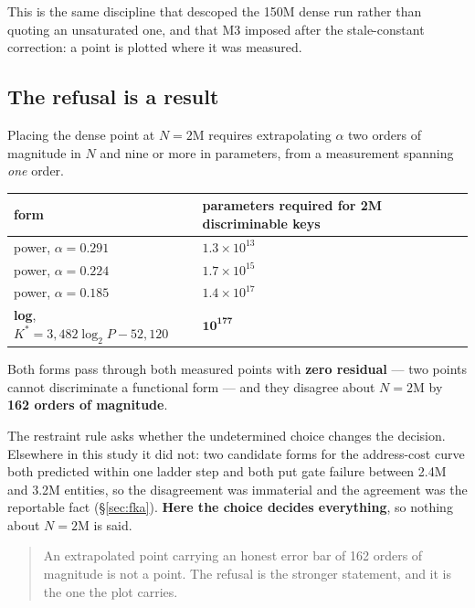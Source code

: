 This is the same discipline that descoped the 150M dense run rather than quoting an unsaturated one,
and that M3 imposed after the stale-constant correction: a point is plotted where it was measured.

\subsection{The refusal is a result}
\label{sec:refusal}

Placing the dense point at $N = 2$M requires extrapolating $\alpha$ two orders of magnitude in $N$
and nine or more in parameters, from a measurement spanning \emph{one} order.

\begin{center}\small
\begin{tabular}{@{}p{4.6cm}p{9.4cm}@{}}
\toprule
form & parameters required for 2M discriminable keys \\
\midrule
power, $\alpha = 0.291$ & $1.3 \times 10^{13}$ \\
power, $\alpha = 0.224$ & $1.7 \times 10^{15}$ \\
power, $\alpha = 0.185$ & $1.4 \times 10^{17}$ \\
\textbf{log}, $K^* = 3{,}482\log_2 P - 52{,}120$ & $\mathbf{10^{177}}$ \\
\bottomrule
\end{tabular}
\end{center}

\medskip
\noindent Both forms pass through both measured points with \textbf{zero residual} --- two points
cannot discriminate a functional form --- and they disagree about $N = 2$M by \textbf{162 orders of
magnitude}.

The restraint rule asks whether the undetermined choice changes the decision. Elsewhere in this
study it did not: two candidate forms for the address-cost curve both predicted within one ladder
step and both put gate failure between 2.4M and 3.2M entities, so the disagreement was immaterial
and the agreement was the reportable fact (\S\ref{sec:fka}). \textbf{Here the choice decides
everything}, so nothing about $N = 2$M is said.

\begin{quote}
An extrapolated point carrying an honest error bar of 162 orders of magnitude is not a point. The
refusal is the stronger statement, and it is the one the plot carries.
\end{quote}

